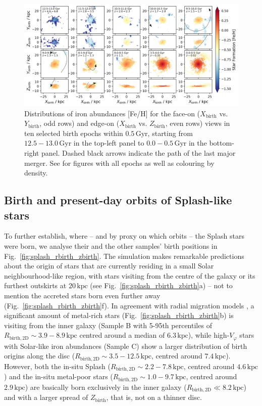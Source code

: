 \documentclass[fleqn,usenatbib]{mnras}
\begin{document}
\begin{figure}
    \centering
    \includegraphics[width=\textwidth]{figures/trace_star_formation_xy_xz_feh_selection.png}
    \caption{Distributions of iron abundances {[Fe/H]} for the face-on ($X_\mathrm{birth}$ vs. $Y_\mathrm{birth}$, odd rows) and edge-on ($X_\mathrm{birth}$ vs. $Z_\mathrm{birth}$, even rows) views in ten selected birth epochs within $0.5\,\mathrm{Gyr}$, starting from $12.5-13.0\,\mathrm{Gyr}$ in the top-left panel to $0.0-0.5\,\mathrm{Gyr}$ in the bottom-right panel. Dashed black arrows indicate the path of the last major merger. See \href{https://github.com/svenbuder/golden_thread_II/tree/main/figures}{\faGithub} for figures with all epochs as well as colouring by density.}
    \label{fig:trace_star_formation_xy_xz_feh_selection}
\end{figure}

\subsection{Birth and present-day orbits of Splash-like stars}

To further establish, where -- and by proxy on which orbits -- the Splash stars were born, we analyse their and the other samples' birth positions in Fig.~\ref{fig:splash_rbirth_zbirth}. The simulation makes remarkable predictions about the origin of stars that are currently residing in a small Solar neighbourhood-like region, with stars visiting from the centre of the galaxy or its furthest outskirts at $20\,\mathrm{kpc}$ (see Fig.~\ref{fig:splash_rbirth_zbirth}a) -- not to mention the accreted stars born even further away (Fig.~\ref{fig:splash_rbirth_zbirth}f). In agreement with radial migration models \citep[for example][]{Frankel2018, Frankel2020}, a significant amount of metal-rich stars (Fig.~\ref{fig:splash_rbirth_zbirth}b) is visiting from the inner galaxy (Sample B with 5-95th percentiles of $R_\mathrm{birth, 2D} \sim 3.9 - 8.9\,\mathrm{kpc}$ centred around a median of $6.3\,\mathrm{kpc}$), while high-$V_\varphi$ stars with Solar-like iron abundances (Sample C) show a larger distribution of birth origins along the disc ($R_\mathrm{birth, 2D} \sim 3.5-12.5\,\mathrm{kpc}$, centred around $7.4\,\mathrm{kpc}$). However, both the in-situ Splash ($R_\mathrm{birth, 2D} \sim 2.2-7.8\,\mathrm{kpc}$, centred around $4.6\,\mathrm{kpc}$) and the in-situ metal-poor stars ($R_\mathrm{birth, 2D} \sim 1.0-9.7\,\mathrm{kpc}$, centred around $2.9\,\mathrm{kpc}$) are basically born exclusively in the inner galaxy ($R_\mathrm{birth, 2D} \ll 8.2\,\mathrm{kpc}$) and with a larger spread of $Z_\mathrm{birth}$, that is, not on a thinner disc.
\end{document}
